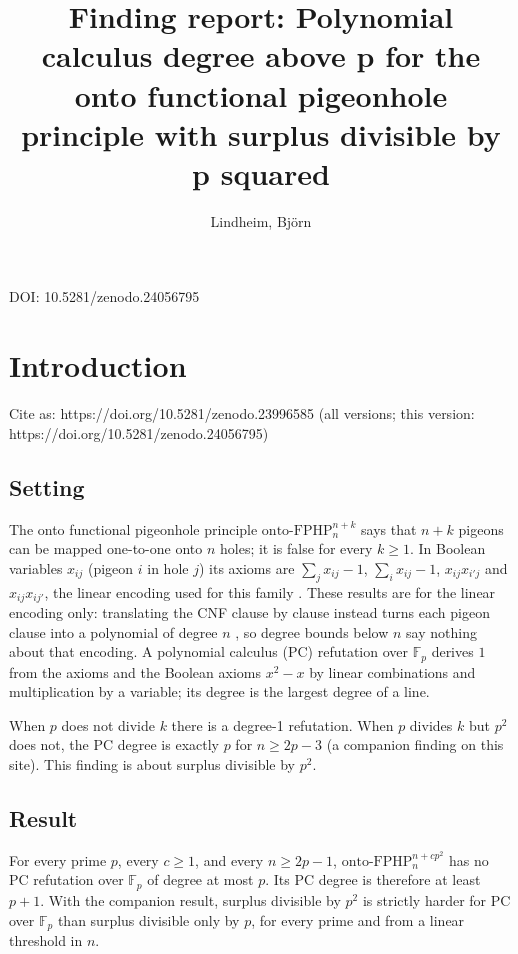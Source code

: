 \documentclass{article}
\title{Finding report: Polynomial calculus degree above p for the onto functional pigeonhole principle with surplus divisible by p squared}
\author{Lindheim, Björn}
\date{}
\begin{document}
\maketitle
\begin{center}DOI: 10.5281/zenodo.24056795\end{center}
\section{Introduction}
\label{sec:pc-degree-above-p-onto-fphp-surplus-p-squared}

Cite as: https://doi.org/10.5281/zenodo.23996585 (all versions; this version: https://doi.org/10.5281/zenodo.24056795)

\subsection*{Setting}

The onto functional pigeonhole principle $\mathrm{onto\text{-}FPHP}^{n+k}_n$ says that $n+k$
pigeons can be mapped one-to-one onto $n$ holes; it is false for every $k\ge1$. In Boolean
variables $x_{ij}$ (pigeon $i$ in hole $j$) its axioms are $\sum_j x_{ij}-1$,
$\sum_i x_{ij}-1$, $x_{ij}x_{i'j}$ and $x_{ij}x_{ij'}$, the linear encoding used for this family
\cite{beame1998counting,razborov2001php}. These results are for the linear encoding only: translating the CNF clause by clause instead turns each pigeon clause into a polynomial of degree $n$ \cite{razborov2001php}, so degree bounds below $n$ say nothing about that encoding. A polynomial calculus (PC) refutation over
$\mathbb F_p$ derives $1$ from the axioms and the Boolean axioms $x^2-x$ by linear combinations
and multiplication by a variable; its degree is the largest degree of a line.

When $p$ does not divide $k$ there is a degree-1 refutation. When $p$ divides $k$ but $p^2$ does
not, the PC degree is exactly $p$ for $n\ge2p-3$ (a companion finding on this site). This finding
is about surplus divisible by $p^2$.

\subsection*{Result}

For every prime $p$, every $c\ge1$, and every $n\ge2p-1$, $\mathrm{onto\text{-}FPHP}^{n+cp^2}_n$ has
no PC refutation over $\mathbb F_p$ of degree at most $p$. Its PC degree is therefore at least
$p+1$. With the companion result, surplus divisible by $p^2$ is strictly harder for PC over
$\mathbb F_p$ than surplus divisible only by $p$, for every prime and from a linear threshold in
$n$.
\end{document}
